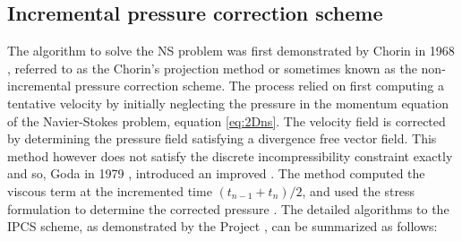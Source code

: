 \subsection{Incremental pressure correction scheme}
\label{subsec:ipcs}
The algorithm to solve the NS problem was first demonstrated by Chorin in 1968 \cite{Chorin1968}, referred to as the Chorin's projection method or sometimes known as the non-incremental pressure correction scheme. The process relied on first computing a tentative velocity by initially neglecting the pressure in the momentum equation of the Navier-Stokes problem, equation \ref{eq:2Dns}. The velocity field is corrected by determining the pressure field satisfying a divergence free vector field. This method however does not satisfy the discrete incompressibility constraint exactly and so, Goda in 1979 \cite{Goda1979a}, introduced an improved . The method computed the viscous term at the incremented time $(t_{n-1} + t_n)/2$, and used the stress formulation to determine the corrected pressure \cite{Logg2012b}. The detailed algorithms to the IPCS scheme, as demonstrated by the \fenics Project \cite{Logg2012b}, can be summarized as follows:

